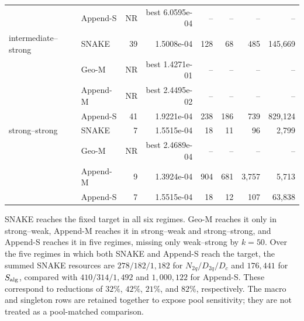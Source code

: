 \documentclass[
  reprint,
  amsmath,
  amssymb,
  aps,
  pra,
  nofootinbib,
  superscriptaddress,
  floatfix
]{revtex4-2}
\begin{document}
\begin{minipage}{\textwidth}
\begin{center}
\begin{tabular}{@{}llrrrrrr@{}}
 & Append-S & NR & best 6.0595e-04 & -- & -- & -- & -- \\
\addlinespace[1.5pt]
intermediate--strong & SNAKE & 39 & 1.5008e-04 & 128 & 68 & 485 & 145,669 \\
 & Geo-M & NR & best 1.4271e-01 & -- & -- & -- & -- \\
 & Append-M & NR & best 2.4495e-02 & -- & -- & -- & -- \\
 & Append-S & 41 & 1.9221e-04 & 238 & 186 & 739 & 829,124 \\
\addlinespace[1.5pt]
strong--strong & SNAKE & 7 & 1.5515e-04 & 18 & 11 & 96 & 2,799 \\
 & Geo-M & NR & best 2.4689e-04 & -- & -- & -- & -- \\
 & Append-M & 9 & 1.3924e-04 & 904 & 681 & 3,757 & 5,713 \\
 & Append-S & 7 & 1.5515e-04 & 18 & 12 & 107 & 63,838 \\
\bottomrule
\end{tabular}
\end{center}
\end{minipage}
\clearpage
\twocolumngrid
\par\addvspace{0.45ex}
SNAKE reaches the fixed target in all six regimes. Geo-M reaches it only in
strong--weak, Append-M reaches it in strong--weak and strong--strong, and
Append-S reaches it in five regimes, missing only weak--strong by $k=50$.
Over the five regimes in which both SNAKE and Append-S reach the target, the
summed SNAKE resources are $278/182/1{,}182$ for
$N_{2q}/D_{2q}/D_c$ and $176{,}441$ for $S_{\rm alg}$, compared with
$410/314/1{,}492$ and $1{,}000{,}122$ for Append-S. These correspond to
reductions of $32\%$, $42\%$, $21\%$, and $82\%$, respectively.
The macro and singleton rows are retained together to expose pool sensitivity;
they are not treated as a pool-matched comparison.
\par\addvspace{1.0ex}
\end{document}
